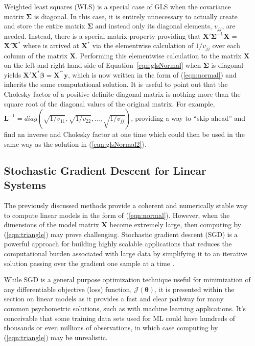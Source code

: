 \documentclass[12pt]{article}
\begin{document}
Weighted least squares (WLS) is a special case of GLS when the covariance matrix $\bm{\Sigma}$ is diagonal. In this case, it is entirely unnecessary to actually create and store the entire matrix $\bm{\Sigma}$ and instead only its diagonal elements, $v_{jj}$, are needed. Instead, there is a special matrix property providing that $\bm{X'\Sigma^{-1}X}$ =  $\bm{X'X^*}$ where is arrived at $\bm{X}^*$ via the elementwise calculation of $1/v_{jj}$ over each column of the matrix $\bm{X}$. Performing this elementwise calculation to the matrix $\bm{X}$ on the left and right hand side of Equation~\ref{eqn:glsNormal} when $\bm{\Sigma}$ is diagonal yields $\bm{X'X^*}\bm{\beta} = \bm{X^{*'}y}$, which is now written in the form of (\ref{eqn:normal}) and inherits the same computational solution. It is useful to point out that the Cholesky factor of a positive definite diagonal matrix is nothing more than the square root of the diagonal values of the original matrix. For example, $\bm{L}^{-1} = diag(\sqrt{1/v_{11}},\sqrt{1/v_{22}}, \ldots, \sqrt{1/v_{jj}})$, providing a way to ``skip ahead'' and find an inverse and Cholesky factor at one time which could then be used in the same way as the solution in (\ref{eqn:glsNormal2}). 

\subsection*{Stochastic Gradient Descent for Linear Systems}

The previously discussed methods provide a coherent and numerically stable way to compute linear models in the form of (\ref{eqn:normal}). However, when the dimensions of the model matrix $\bm{X}$ become extremely large, then computing by (\ref{eqn:triangle}) may prove challenging. Stochastic gradient descent (SGD) is a powerful approach for building highly scalable applications that reduces the computational burden associated with large data by simplifying it to an iterative solution passing over the gradient one sample at a time \cite{cizek,shamir,tran}.  

While SGD is a general purpose optimization technique useful for minimization of any differentiable objective (loss) function, $\mathcal{J}(\bm{\theta})$, it is presented within the section on linear models as it provides a fast and clear pathway for many common psychometric solutions, such as with machine learning applications. It's conceivable that some training data sets used for ML could have hundreds of thousands or even millions of observations, in which case computing by (\ref{eqn:triangle}) may be unrealistic.   
\end{document}
